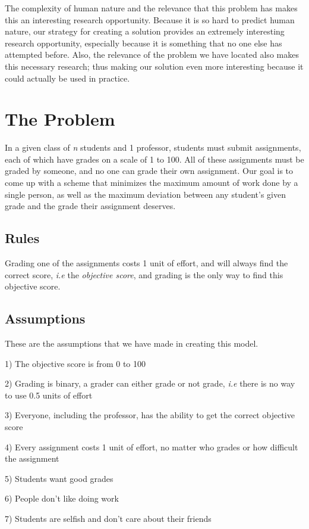 \documentclass[12pt, Helvetica]{article}
\begin{document}
The complexity of human nature and the relevance that this problem has makes this an interesting research opportunity. Because it is so hard to predict human nature, our strategy for creating a solution provides an extremely interesting research opportunity, especially because it is something that no one else has attempted before. Also, the relevance of the problem we have located also makes this necessary research; thus making our solution even more interesting because it could actually be used in practice.

\section{The Problem}
In a given class of \emph{n} students and 1 professor, students must submit assignments, each of which have grades on a scale of 1 to 100. All of these assignments must be graded by someone, and no one can grade their own assignment. Our goal is to come up with a scheme that minimizes the maximum amount of work done by a single person, as well as the maximum deviation between any student's given grade and the grade their assignment deserves.

\subsection{Rules}
Grading one of the assignments costs 1 unit of effort, and will always find the correct score, \emph{i.e} the \emph{objective score}, and grading is the only way to find this objective score.
\subsection{Assumptions}
These are the assumptions that we have made in creating this model.

1) The objective score is from 0 to 100

2) Grading is binary, a grader can either grade or not grade, \emph{i.e} there is no way to use 0.5 units of effort

3) Everyone, including the professor, has the ability to get the correct objective score

4) Every assignment costs 1 unit of effort, no matter who grades or how difficult the assignment

5) Students want good grades

6) People don't like doing work

7) Students are selfish and don't care about their friends
\end{document}
